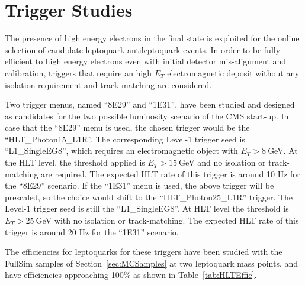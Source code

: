 %
\section{Trigger Studies} \label{sec:trig}

The presence of high energy electrons in the final state is exploited for the online selection 
of candidate leptoquark-antileptoquark events.
In order to be fully efficient to high energy electrons even with initial detector mis-alignment 
and calibration, triggers that require an high $E_T$ electromagnetic deposit without any isolation 
requirement and track-matching are considered.

Two trigger menus, named ``8E29'' and ``1E31'', have been studied and designed as candidates for 
the two possible luminosity scenario of the CMS start-up.
In case that the ``8E29'' menu is used, the chosen trigger would be the ``HLT\_Photon15\_L1R''.
The corresponding Level-1 trigger seed is ``L1\_SingleEG8'', which requires an electromagnetic object with 
$E_T>8~$GeV. At the HLT level, the threshold applied is $E_T>15~$GeV and no isolation or track-matching
are required. The expected HLT rate of this trigger is around 10 Hz for the ``8E29'' scenario.
If the ``1E31'' menu is used, the above trigger will be prescaled, so the choice would shift to the
``HLT\_Photon25\_L1R'' trigger. The Level-1 trigger seed is still the ``L1\_SingleEG8''. At HLT level the 
threshold is $E_T>25~$GeV with no isolation or track-matching. 
The expected HLT rate of this trigger is around 20 Hz for the ``1E31'' scenario.

The efficiencies for leptoquarks for these triggers have been studied with the FullSim 
samples of Section~\ref{sec:MCSamples} at two leptoquark mass points, and have efficiencies approaching
100\% as shown in Table~\ref{tab:HLTEffic}.

